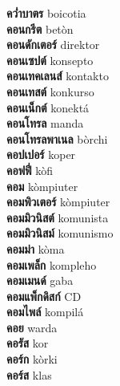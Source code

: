 \textbf{ คว่ำบาตร  } boicotia \\
\textbf{ คอนกรีต  } betòn \\
\textbf{ คอนดักเตอร์  } direktor \\
\textbf{ คอนเซปต์  } konsepto \\
\textbf{ คอนเทคเลนส์  } kontakto \\
\textbf{ คอนเทสต์  } konkurso \\
\textbf{ คอนเน็กต์  } konektá \\
\textbf{ คอนโทรล  } manda \\
\textbf{ คอนโทรลพาเนล  } bòrchi \\
\textbf{ คอปเปอร์  } koper \\
\textbf{ คอฟฟี่  } kòfi \\
\textbf{ คอม  } kòmpiuter \\
\textbf{ คอมพิวเตอร์  } kòmpiuter \\
\textbf{ คอมมิวนิสต์  } komunista \\
\textbf{ คอมมิวนิสม์  } komunismo \\
\textbf{ คอมม่า  } kòma \\
\textbf{ คอมเพล็ก  } kompleho \\
\textbf{ คอมเมนด์  } gaba \\
\textbf{ คอมแพ็กดิสก์  } CD \\
\textbf{ คอมไพล์  } kompilá \\
\textbf{ คอย  } warda \\
\textbf{ คอรัส  } kor \\
\textbf{ คอร์ก  } kòrki \\
\textbf{ คอร์ส  } klas \\
